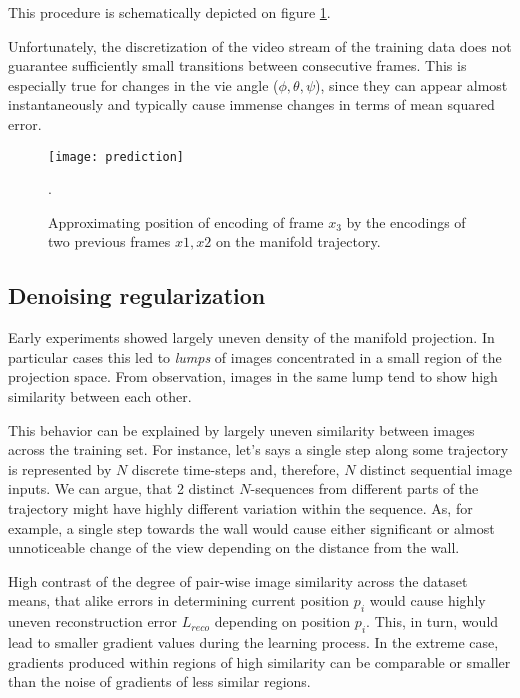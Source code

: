 This procedure is schematically depicted on figure \ref{fig:m_pred}.

Unfortunately, the discretization of the video stream of the training data does not guarantee sufficiently small transitions between consecutive frames.
This is especially true for changes in the vie angle ($\phi, \theta, \psi$), since they can appear almost instantaneously and typically cause immense changes in terms of mean squared error.

\begin{figure}[h!]
  \centering
    \texttt{[image: prediction]}
  \caption{Approximating position of encoding of frame $x_3$ by the encodings of two previous frames $x1, x2$ on the manifold trajectory.}.
  \label{fig:m_pred}
\end{figure}


\subsection{Denoising regularization}

Early experiments showed largely uneven density of the manifold projection.
In particular cases this led to \textit{lumps} of images concentrated in a small region of the projection space.
From observation, images in the same lump tend to show high similarity between each other.

This behavior can be explained by largely uneven similarity between images across the training set.
For instance, let's says a single step along some trajectory is represented by $N$ discrete time-steps and, therefore, $N$ distinct sequential image inputs.
We can argue, that 2 distinct $N$-sequences from different parts of the trajectory might have highly different variation within the sequence.
As, for example, a single step towards the wall would cause either significant or almost unnoticeable change of the view depending on the distance from the wall.

High contrast of the degree of pair-wise image similarity across the dataset means, that alike errors in determining current position $p_i$ would cause highly uneven reconstruction error $L_{reco}$ depending on position $p_i$.
This, in turn, would lead to smaller gradient values during the learning process.
In the extreme case, gradients produced within regions of high similarity can be comparable or smaller than the noise of gradients of less similar regions.


